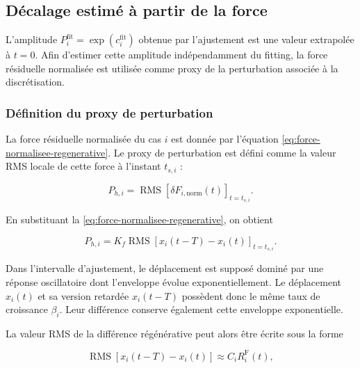 \documentclass[
    11pt,
    a4paper
]{article}
\begin{document}
\subsection{Décalage estimé à partir de la force}
\label{subsec:decalage-force}

L’amplitude \(P_i^{\mathrm{fit}}=\exp(c_i^{\mathrm{fit}})\) obtenue par l’ajustement est une valeur extrapolée
à \(t=0\). Afin d’estimer cette amplitude indépendamment du fitting, la force
résiduelle normalisée est utilisée comme proxy de la perturbation associée à la
discrétisation.


\subsubsection{Définition du proxy de perturbation}
\label{subsubsec:relation-proxy-amplitude}

La force résiduelle normalisée du cas \(i\) est donnée par l'équation \ref{eq:force-normalisee-regenerative}. Le proxy de perturbation est défini comme la valeur RMS locale de cette force
à l’instant \(t_{s,i}\) :

\begin{equation}
    P_{h,i}
    =
    \operatorname{RMS}
    \left[
        \delta F_{i,\mathrm{norm}}(t)
    \right]_{t=t_{s,i}}.
    \label{eq:definition-proxy-force}
\end{equation}

En substituant la \ref{eq:force-normalisee-regenerative}, on obtient

\begin{equation}
    P_{h,i}
    =
    K_f
    \operatorname{RMS}
    \left[
        x_i(t-T)-x_i(t)
    \right]_{t=t_{s,i}}.
    \label{eq:proxy-difference-regenerative}
\end{equation}

Dans l’intervalle d’ajustement, le déplacement est supposé dominé par une
réponse oscillatoire dont l’enveloppe évolue exponentiellement. Le déplacement
\(x_i(t)\) et sa version retardée \(x_i(t-T)\) possèdent donc le même taux de
croissance \(\beta_i\). Leur différence conserve également cette enveloppe
exponentielle.

La valeur RMS de la différence régénérative peut alors être écrite sous la
forme

\begin{equation}
    \operatorname{RMS}
    \left[
        x_i(t-T)-x_i(t)
    \right]
    \approx
    C_i R_i^{\mathrm{F}}(t),
    \label{eq:proportion-difference-deplacement}
\end{equation}
\end{document}
